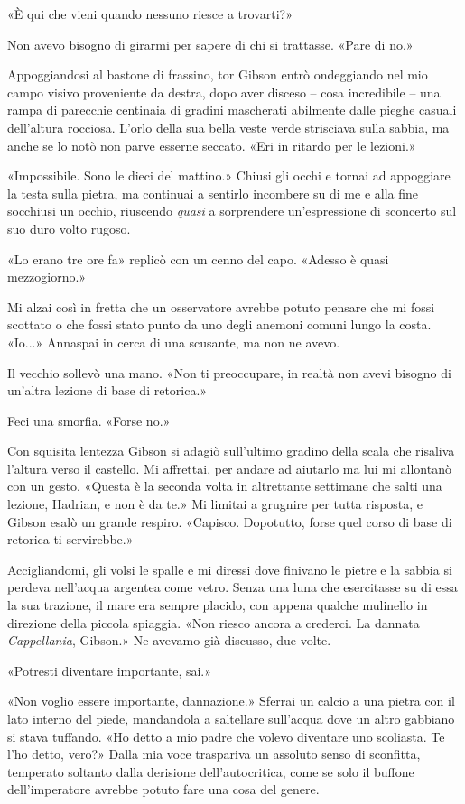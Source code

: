 «È qui che vieni quando nessuno riesce a trovarti?»

Non avevo bisogno di girarmi per sapere di chi si trattasse. «Pare di
no.»

Appoggiandosi al bastone di frassino, tor Gibson entrò ondeggiando nel
mio campo visivo proveniente da destra, dopo aver disceso -- cosa
incredibile -- una rampa di parecchie centinaia di gradini mascherati
abilmente dalle pieghe casuali dell'altura rocciosa. L'orlo della sua
bella veste verde strisciava sulla sabbia, ma anche se lo notò non parve
esserne seccato. «Eri in ritardo per le lezioni.»

«Impossibile. Sono le dieci del mattino.» Chiusi gli occhi e tornai ad
appoggiare la testa sulla pietra, ma continuai a sentirlo incombere su
di me e alla fine socchiusi un occhio, riuscendo \emph{quasi} a
sorprendere un'espressione di sconcerto sul suo duro volto rugoso.

«Lo erano tre ore fa» replicò con un cenno del capo. «Adesso è quasi
mezzogiorno.»

Mi alzai così in fretta che un osservatore avrebbe potuto pensare che mi
fossi scottato o che fossi stato punto da uno degli anemoni comuni lungo
la costa. «Io...» Annaspai in cerca di una scusante, ma non ne avevo.

Il vecchio sollevò una mano. «Non ti preoccupare, in realtà non avevi
bisogno di un'altra lezione di base di retorica.»

Feci una smorfia. «Forse no.»

Con squisita lentezza Gibson si adagiò sull'ultimo gradino della scala
che risaliva l'altura verso il castello. Mi affrettai, per andare ad
aiutarlo ma lui mi allontanò con un gesto. «Questa è la seconda volta in
altrettante settimane che salti una lezione, Hadrian, e non è da te.» Mi
limitai a grugnire per tutta risposta, e Gibson esalò un grande respiro.
«Capisco. Dopotutto, forse quel corso di base di retorica ti
servirebbe.»

Accigliandomi, gli volsi le spalle e mi diressi dove finivano le pietre
e la sabbia si perdeva nell'acqua argentea come vetro. Senza una luna
che esercitasse su di essa la sua trazione, il mare era sempre placido,
con appena qualche mulinello in direzione della piccola spiaggia. «Non
riesco ancora a crederci. La dannata \emph{Cappellania}, Gibson.» Ne
avevamo già discusso, due volte.

«Potresti diventare importante, sai.»

«Non voglio essere importante, dannazione.» Sferrai un calcio a una
pietra con il lato interno del piede, mandandola a saltellare sull'acqua
dove un altro gabbiano si stava tuffando. «Ho detto a mio padre che
volevo diventare uno scoliasta. Te l'ho detto, vero?» Dalla mia voce
traspariva un assoluto senso di sconfitta, temperato soltanto dalla
derisione dell'autocritica, come se solo il buffone dell'imperatore
avrebbe potuto fare una cosa del genere.

